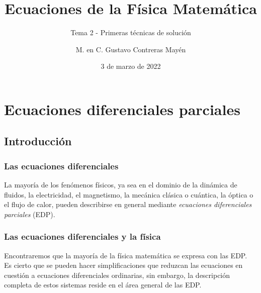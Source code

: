 \documentclass[12pt]{beamer}
\date{3 de marzo de 2022}
\title{\large{Ecuaciones de la Física Matemática}}
\subtitle{Tema 2 - Primeras técnicas de solución}
\author{M. en C. Gustavo Contreras Mayén}
\begin{document}
\maketitle
\fontsize{14}{14}\selectfont
{}


\section{Ecuaciones diferenciales parciales}
\subsection{Introducción}

\begin{frame}
\frametitle{Las ecuaciones diferenciales}
La mayoría de los fenómenos físicos, ya sea en el dominio de la dinámica de fluidos, la electricidad, el magnetismo, la mecánica clásica o cuántica, la óptica o el flujo de calor, pueden describirse en general mediante \emph{ecuaciones diferenciales parciales} (EDP).
\end{frame}
\begin{frame}
\frametitle{Las ecuaciones diferenciales y la física}
Encontraremos que la mayoría de la física matemática se expresa con las EDP.
\\
\bigskip
\pause
Es cierto que se pueden hacer simplificaciones que reduzcan las ecuaciones en cuestión a ecuaciones diferenciales ordinarias, sin embargo, la descripción completa de estos sistemas reside en el área general de las EDP.
\end{frame}
\end{document}
